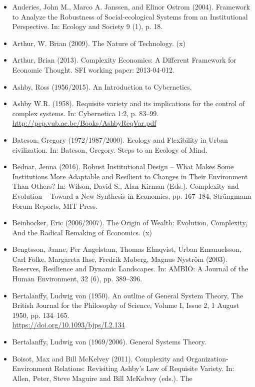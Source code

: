 \documentclass[11pt,a4paper]{article}
\begin{document}
\begin{itemize}
\item Anderies, John M., Marco A. Janssen, and Elinor Ostrom (2004).
  Framework to Analyze the Robustness of Social-ecological Systems from an
  Institutional Perspective. In: Ecology and Society 9 (1), p. 18.
\item Arthur, W. Brian (2009). The Nature of Technology. (x)
\item Arthur, Brian (2013). Complexity Economics: A Different Framework for
  Economic Thought. SFI working paper: 2013-04-012. 
\item Ashby, Ross (1956/2015). An Introduction to Cybernetics. 
\item Ashby W.R. (1958).  Requisite variety and its implications for the
  control of complex systems. In: Cybernetica 1:2, p. 83--99.\\
  \url{http://pcp.vub.ac.be/Books/AshbyReqVar.pdf}
\item Bateson, Gregory (1972/1987/2000). Ecology and Flexibility in Urban
  civilization. In: Bateson, Gregory. Steps to an Ecology of Mind.
\item Bednar, Jenna (2016). Robust Institutional Design – What Makes Some
  Institutions More Adaptable and Resilient to Changes in Their Environment
  Than Others? In: Wilson, David S., Alan Kirman (Eds.).  Complexity and
  Evolution -- Toward a New Synthesis in Economics, pp. 167--184, Strüngmann
  Forum Reports, MIT Press.
\item Beinhocker, Eric (2006/2007). The Origin of Wealth: Evolution,
  Complexity, And the Radical Remaking of Economics.  (x)
\item Bengtsson, Janne, Per Angelstam, Thomas Elmqvist, Urban Emanuelsson,
  Carl Folke, Margareta Ihse, Fredrik Moberg, Magnus Nyström (2003).
  Reserves, Resilience and Dynamic Landscapes. In: AMBIO: A Journal of the
  Human Environment, 32 (6), pp. 389--396.  
\item Bertalanffy, Ludwig von (1950). An outline of General System Theory,
  The British Journal for the Philosophy of Science, Volume I, Issue 2, 1
  August 1950, pp. 134–165.\\ \url{https://doi.org/10.1093/bjps/I.2.134}
\item Bertalanffy, Ludwig von (1969/2006). General Systems Theory. 
\item Boisot, Max and Bill McKelvey (2011). Complexity and
  Organization-Environment Relations: Revisiting Ashby’s Law of Requisite
  Variety. In: Allen, Peter, Steve Maguire and Bill McKelvey (eds.). The

\end{itemize}
\end{document}
